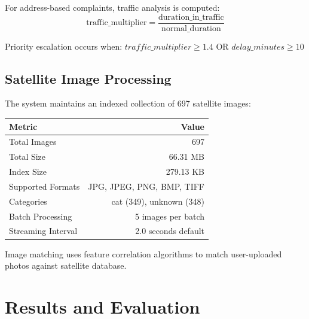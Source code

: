 \documentclass[11pt,a4paper]{article}
\begin{document}
For address-based complaints, traffic analysis is computed:
\[\text{traffic\_multiplier} = \frac{\text{duration\_in\_traffic}}{\text{normal\_duration}}\]

Priority escalation occurs when: $traffic\_multiplier \geq 1.4$ OR $delay\_minutes \geq 10$

\subsection{Satellite Image Processing}

The system maintains an indexed collection of 697 satellite images:

\begin{table}[H]
\centering
\begin{tabular}{|l|r|}
\hline
\textbf{Metric} & \textbf{Value} \\
\hline
Total Images & 697 \\
Total Size & 66.31 MB \\
Index Size & 279.13 KB \\
Supported Formats & JPG, JPEG, PNG, BMP, TIFF \\
Categories & cat (349), unknown (348) \\
Batch Processing & 5 images per batch \\
Streaming Interval & 2.0 seconds default \\
\hline
\end{tabular}
\end{table}

Image matching uses feature correlation algorithms to match user-uploaded photos against satellite database.

\section{Results and Evaluation}
\end{document}
